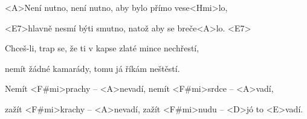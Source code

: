 

\zr
<A>Není nutno, není nutno, aby bylo přímo vese<Hmi>lo,

<E7>hlavně nesmí býti smutno, natož aby se breče<A>lo. <E7>
\kr

\zs
Chceš-li, trap se, že ti v kapse zlaté mince nechřestí,

nemít žádné kamarády, tomu já říkám neštěstí.
\ks

\zs
Nemít <F#mi>prachy -- <A>nevadí, nemít <F#mi>srdce -- <A>vadí,

zažít <F#mi>krachy -- <A>nevadí, zažít <F#mi>nudu -- <D>jó to <E>vadí.
\ks


\zr \kr

\zr \kr

\kp






